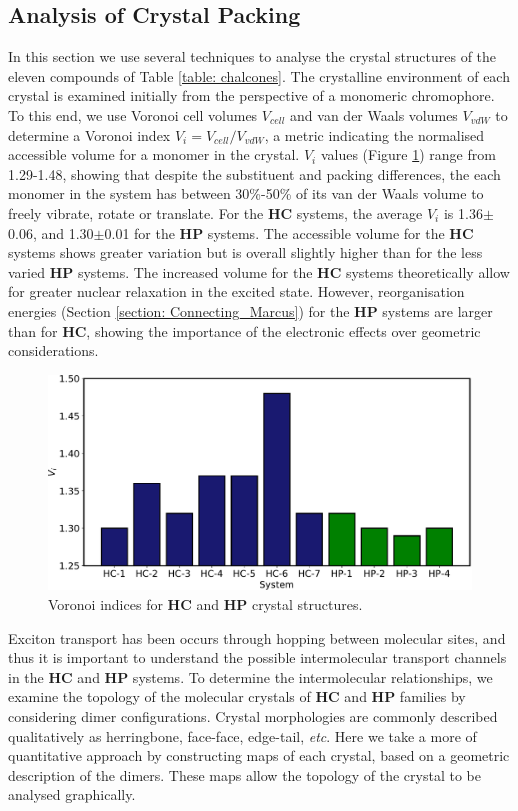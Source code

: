 \subsection{Analysis of Crystal Packing} \label{section: Connecting_Motifs}
In this section we use several techniques to analyse the crystal structures of the eleven compounds of Table \ref{table: chalcones}. The crystalline environment of each crystal is examined initially from the perspective of a monomeric chromophore. To this end, we use Voronoi cell volumes $V_{cell}$ and van der Waals volumes $V_{vdW}$ to determine a Voronoi index $V_{i}=V_{cell}/V_{vdW}$, a metric indicating the normalised accessible volume for a monomer in the crystal. $V_{i}$ values (Figure \ref{figure: voronoi_index}) range from 1.29-1.48, showing that despite the substituent and packing differences, the each monomer in the system has between 30\%-50\% of its van der Waals volume to freely vibrate, rotate or translate. For the \textbf{HC} systems, the average $V_{i}$ is 1.36$\pm$0.06, and 1.30$\pm$0.01 for the \textbf{HP} systems. The accessible volume for the \textbf{HC} systems shows greater variation but is overall slightly higher than for the less varied \textbf{HP} systems. The increased volume for the \textbf{HC} systems theoretically allow for greater nuclear relaxation in the excited state. However, reorganisation energies (Section \ref{section: Connecting_Marcus}) for the \textbf{HP} systems are larger than for \textbf{HC}, showing the importance of the electronic effects over geometric considerations. 
\begin{figure}[t]
\centering
  \includegraphics[width=0.8\linewidth]{5ConnectingCrystalStructure/Voronoi_Index}
  \caption{Voronoi indices for \textbf{HC} and \textbf{HP} crystal structures.}
  \label{figure: voronoi_index}
\end{figure}

Exciton transport has been occurs through hopping between molecular sites, and thus it is important to understand the possible intermolecular transport channels in the \textbf{HC} and \textbf{HP} systems.\cite{Bredas2004} To determine the intermolecular relationships, we examine the topology of the molecular crystals of \textbf{HC} and \textbf{HP} families by considering dimer configurations. Crystal morphologies are commonly described qualitatively as herringbone, face-face, edge-tail, \textit{etc}. Here we take a more of quantitative approach by constructing maps of each crystal, based on a geometric description of the dimers. These maps allow the topology of the crystal to be analysed graphically.


